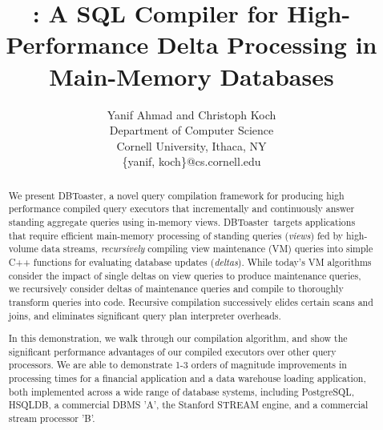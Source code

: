 \documentclass{vldb}
\title{\compiler: A SQL Compiler for High-Performance Delta Processing in
Main-Memory Databases}
\author{Yanif Ahmad and Christoph Koch \\
Department of Computer Science \\ Cornell University, Ithaca, NY \\
\{yanif, koch\}@cs.cornell.edu}
\date{}
\newcommand{\comment}[1]{}
\newcommand{\compiler}{DBToaster}
\begin{document}
\maketitle

\begin{abstract}
We present \compiler, a novel query compilation framework for producing high
performance compiled query executors that incrementally and continuously answer
standing aggregate queries using in-memory views. \compiler\ targets applications
that require efficient main-memory processing of standing queries
(\textit{views}) fed by high-volume data streams, \textit{recursively} compiling
view maintenance (VM) que\-ries into simple C++ functions for evaluating database
updates (\textit{deltas}).
While today's VM algorithms consider the impact of single deltas on view queries
to produce maintenance queries, we recursively consider deltas of maintenance
queries and compile to thoroughly transform queries into code. Recursive
compilation successively elides certain scans and joins, and eliminates
significant query plan interpreter overheads.
\comment{
Our compilation process models and implements group-by aggregates as
an associative map data structure, and obtains procedures to update these maps by
applying a set of map expression rewrites, which can then easily be turned into
C++ code.
}

In this demonstration, we walk through our compilation algorithm, and show the
significant performance advantages of our compiled executors over other query
processors. We are able to demonstrate 1-3 orders of magnitude improvements in
processing times for a financial application and a data warehouse loading
application, both implemented across a wide range of database systems, including
PostgreSQL, HSQLDB, a commercial DBMS 'A', the Stanford STREAM engine, and a
commercial stream processor 'B'.
\end{abstract}









\end{document}

